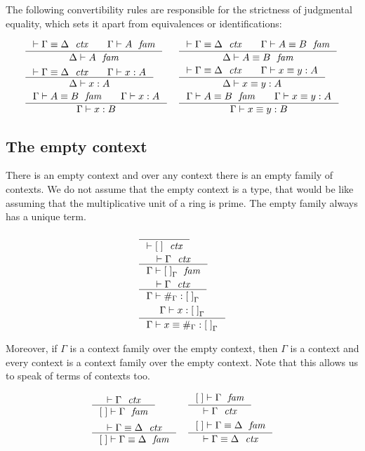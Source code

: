 The following convertibility rules are responsible for the strictness
of judgmental equality, which sets it apart from equivalences or identifications:

\begin{align*}
& \inference{\jctxeq{\Gamma}{\Delta}\qquad\jfam{\Gamma}{A}}{\jfam{\Delta}{A}}
& & \inference{\jctxeq{\Gamma}{\Delta}\qquad\jfameq{\Gamma}{A}{B}}{\jfameq{\Delta}{A}{B}}\\
& \inference{\jctxeq{\Gamma}{\Delta}\qquad\jterm{\Gamma}{A}{x}}{\jterm{\Delta}{A}{x}}
& & \inference{\jctxeq{\Gamma}{\Delta}\qquad\jtermeq{\Gamma}{A}{x}{y}}{\jtermeq{\Delta}{A}{x}{y}}\\
& \inference{\jfameq{\Gamma}{A}{B}\qquad \jterm{\Gamma}{A}{x}}{\jterm{\Gamma}{B}{x}}
& & \inference{\jfameq{\Gamma}{A}{B}\qquad\jtermeq{\Gamma}{A}{x}{y}}{\jtermeq{\Gamma}{B}{x}{y}}
\end{align*}

\subsection{The empty context}
There is an empty context and over any context there is an empty family of
contexts. We do not assume that the empty context is a type, that would be like
assuming that the multiplicative unit of a ring is prime. The empty family
always has a unique term. 

\begin{align}
& \inference{}{\jctx{\emptyc}}\\
& \inference{\jctx{\Gamma}}{\jfam{\Gamma}{\emptyf[\Gamma]}}\\
& \inference{\jctx{\Gamma}}{\jterm{\Gamma}{\emptyf[\Gamma]}{\emptytm[\Gamma]}}\\
& \inference{\jterm{\Gamma}{\emptyf[\Gamma]}{x}}{\jtermeq{\Gamma}{\emptyf[\Gamma]}{x}{\emptytm[\Gamma]}}
\end{align}

Moreover, if $\Gamma$ is a context family over the
empty context, then $\Gamma$ is a context and every context is a context
family over the empty context. Note that this allows us to speak
of terms of contexts too.

\begin{align}
& \inference{\jctx{\Gamma}}{\jfam{\emptyc}{\Gamma}} 
& & \inference{\jfam{\emptyc}{\Gamma}}{\jctx{\Gamma}}\\
& \inference{\jctxeq{\Gamma}{\Delta}}{\jfameq{\emptyc}{\Gamma}{\Delta}}
& & \inference{\jfameq{\emptyc}{\Gamma}{\Delta}}{\jctxeq{\Gamma}{\Delta}}
\end{align}

